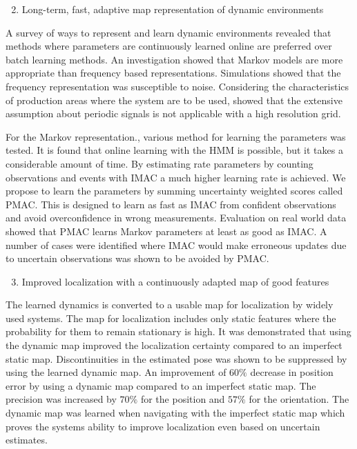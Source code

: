 \begin{enumerate}
    \setcounter{enumi}{1}
    \item Long-term, fast, adaptive map representation of dynamic environments
\end{enumerate}

A survey of ways to represent and learn dynamic environments revealed that methods where parameters are continuously learned online are preferred over batch learning methods.
An investigation showed that Markov models are more appropriate than frequency based representations.
Simulations showed that the frequency representation was susceptible to noise. 
Considering the characteristics of production areas where the system are to be used, showed that the extensive assumption about periodic signals is not applicable with a high resolution grid.

For the Markov representation., various method for learning the parameters was tested. It is found that online learning with the HMM is possible, but it takes a considerable amount of time.
By estimating rate parameters by counting observations and events with IMAC a much higher learning rate is achieved.
We propose to learn the parameters by summing uncertainty weighted scores called PMAC. This is designed to learn as fast as IMAC from confident observations and avoid overconfidence in wrong measurements.
Evaluation on real world data showed that PMAC learns Markov parameters at least as good as IMAC.
A number of cases were identified where IMAC would make erroneous updates due to uncertain observations was shown to be avoided by PMAC. 

\begin{enumerate}
    \setcounter{enumi}{2}
    \item Improved localization with a continuously adapted map of good features
\end{enumerate}
The learned dynamics is converted to a usable map for localization by widely used systems.
The map for localization includes only static features where the probability for them to remain stationary is high.
It was demonstrated that using the dynamic map improved the localization certainty compared to an imperfect static map.
Discontinuities in the estimated pose was shown to be suppressed by using the learned dynamic map.
An improvement of $60\%$ decrease in position error by using a dynamic map compared to an imperfect static map. 
The precision was increased by $70\%$ for the position and $57\%$ for the orientation. 
The dynamic map was learned when navigating with the imperfect static map which proves the systems ability to improve localization even based on uncertain estimates. 

